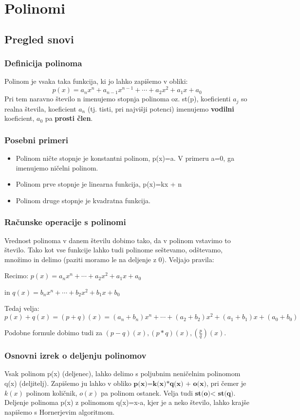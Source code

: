 \chapter{Polinomi}
\label{cha:polinomi}

\section{Pregled snovi}
\label{sec:polinomi-pregled-snovi}


\subsection{Definicija polinoma}
Polinom je vsaka taka funkcija, ki jo lahko zapišemo v obliki:
\[
p(x)=a_nx^n + a_{n-1}x^{n-1}+ \cdots + a_2x^2 + a_1 x + a_0
\]
Pri tem naravno število n imenujemo stopnja polinoma oz. st(p), koeficienti $ a_j$ so realna števila, koeficient $ a_n$ (tj. tisti, pri najvišji potenci) imenujemo \textbf{vodilni} koeficient, $ a_0$ pa \textbf{prosti člen}.
\subsection{Posebni primeri}
\begin{itemize}
\item Polinom ničte stopnje je konstantni polinom, p(x)=a. V primeru a=0, ga imenujemo ničelni polinom.
\item Polinom prve stopnje je linearna funkcija, p(x)=kx + n
\item Polinom druge stopnje je kvadratna funkcija.
\end{itemize}
\subsection{Računske operacije s polinomi}
Vrednost polinoma v danem številu dobimo tako, da v polinom vstavimo to število. 
Tako kot vse funkcije lahko tudi polinome seštevamo, odštevamo, množimo in delimo (paziti moramo le na deljenje z 0). Veljajo pravila:

Recimo: 
$ p(x)=a_nx^n + \cdots + a_2x^2 + a_1 x + a_0$ 

 in  
$ q(x)=b_nx^n + \cdots + b_2x^2 + b_1 x + b_0$ 

Tedaj velja:
$p(x) + q(x) = (p+q)(x) =(a_n + b_n)x^n +\cdots +(a_2 + b_2)x^2 +( a_1 + b_1) x + (a_0+b_0)$

Podobne formule dobimo tudi za $(p-q)(x), (p*q)(x), (\frac{p}{q})(x)$.
\subsection{Osnovni izrek o deljenju polinomov}
Vsak polinom p(x) (deljenec), lahko delimo s poljubnim neničelnim polinomom q(x) (deljitelj). Zapišemo ju lahko v obliko $\textbf{p(x)=k(x)*q(x) + o(x)}$, pri čemer je $k(x)$ polinom količnik, $o(x)$ pa polinom ostanek. Velja tudi $\textbf{st(o)< st(q)}$. Deljenje polinoma p(x) z polinomom q(x)=x-a, kjer je a neko število, lahko krajše napišemo s Hornerjevim algoritmom.
